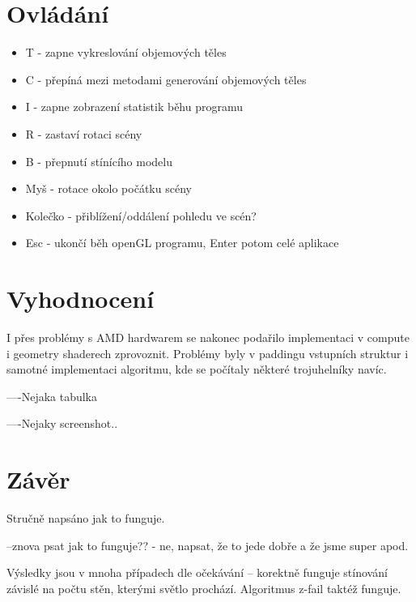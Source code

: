 \documentclass[a4paper, 12pt]{article}
\begin{document}

\section{Ovládání}

\begin{itemize}
	\item T - zapne vykreslování objemových těles
	\item C - přepíná mezi metodami generování objemových těles
	\item I - zapne zobrazení statistik běhu programu
	\item R - zastaví rotaci scény
	\item B - přepnutí stínícího modelu
	\item Myš - rotace okolo počátku scény
	\item Kolečko - přiblížení/oddálení pohledu ve scén?
	\item Esc - ukončí běh openGL programu, Enter potom celé aplikace
\end{itemize}


\section{Vyhodnocení}

I přes problémy s AMD hardwarem se nakonec podařilo implementaci v compute i geometry shaderech zprovoznit.
Problémy byly v paddingu vstupních struktur i samotné implementaci algoritmu, kde se počítaly
některé trojuhelníky navíc. 

----Nejaka tabulka

----Nejaky screenshot..


\section{Závěr}

Stručně napsáno jak to funguje.

--znova psat jak to funguje?? - ne, napsat, že to jede dobře a že jsme super apod.

Výsledky jsou v mnoha případech dle očekávání -- korektně funguje stínování závislé na počtu stěn, kterými světlo prochází. Algoritmus z-fail taktéž funguje.


\begin{flushleft}
  
\end{flushleft}

\end{document}
